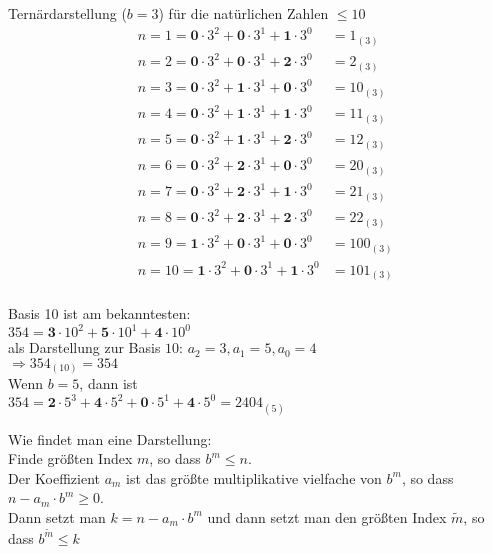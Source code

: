 \documentclass[12pt,a4paper,titlepage,draft]{article}
\begin{document}
	\begin{bsp}
		Ternärdarstellung (\(b = 3\)) für die natürlichen Zahlen \(\leq 10\)\\
		\begin{align*}
			&n = 1 = \textbf{0} \cdot 3^2 + \textbf{0} \cdot 3^1 + \textbf{1} \cdot 3^0 &= 1_{(3)}\\
			&n = 2 = \textbf{0} \cdot 3^2 + \textbf{0} \cdot 3^1 + \textbf{2} \cdot 3^0 &= 2_{(3)}\\
			&n = 3 = \textbf{0} \cdot 3^2 + \textbf{1} \cdot 3^1 + \textbf{0} \cdot 3^0 &= 10_{(3)}\\
			&n = 4 = \textbf{0} \cdot 3^2 + \textbf{1} \cdot 3^1 + \textbf{1} \cdot 3^0 &= 11_{(3)}\\
			&n = 5 = \textbf{0} \cdot 3^2 + \textbf{1} \cdot 3^1 + \textbf{2} \cdot 3^0 &= 12_{(3)}\\
			&n = 6 = \textbf{0} \cdot 3^2 + \textbf{2} \cdot 3^1 + \textbf{0} \cdot 3^0 &= 20_{(3)}\\
			&n = 7 = \textbf{0} \cdot 3^2 + \textbf{2} \cdot 3^1 + \textbf{1} \cdot 3^0 &= 21_{(3)}\\
			&n = 8 = \textbf{0} \cdot 3^2 + \textbf{2} \cdot 3^1 + \textbf{2} \cdot 3^0 &= 22_{(3)}\\
			&n = 9 = \textbf{1} \cdot 3^2 + \textbf{0} \cdot 3^1 + \textbf{0} \cdot 3^0 &= 100_{(3)}\\
			&n = 10 = \textbf{1} \cdot 3^2 + \textbf{0} \cdot 3^1 + \textbf{1} \cdot 3^0 &= 101_{(3)}\\
		\end{align*}
	\end{bsp}
	\begin{bsp}
		Basis 10 ist am bekanntesten:\\
		\(354 = \textbf{3} \cdot 10^2 + \textbf{5} \cdot 10^1 + \textbf{4} \cdot 10^0\)\\
		als Darstellung zur Basis \(10\): \(a_2 = 3, a_1 = 5, a_0 = 4\)\\
		\(\Rightarrow 354_{(10)} = 354\)\\
		Wenn \(b = 5\), dann ist\\
		\(354 = \textbf{2} \cdot 5^3 + \textbf{4} \cdot 5^2 + \textbf{0} \cdot 5^1 + \textbf{4} \cdot 5^0 = 2404_{(5)}\)
	\end{bsp}
	\begin{bem} %
		Wie findet man eine Darstellung:\\
		Finde größten Index \(m\), so dass \(b^m \leq n\).\\
		Der Koeffizient \(a_m\) ist das größte multiplikative vielfache von \(b^m\), so dass \(n - a_m \cdot b^m \geq 0\).\\
		Dann setzt man \(k=n-a_m \cdot b^m\) und dann setzt man den größten Index \(\tilde{m}\), so dass \(b^{\tilde{m}} \leq k\)
	\end{bem}
\end{document}
